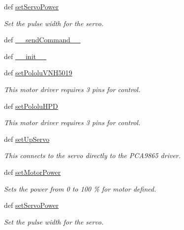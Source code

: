 \begin{DoxyCompactItemize}
def \hyperlink{classinterface_1_1MOTOR__CORE_1_1DC_a9d0cb15bc32abd7e5ffef57a9d83c9b1}{set\+Servo\+Power}
\begin{DoxyCompactList}\small\item\em Set the pulse width for the servo. \end{DoxyCompactList}\item 
def \hyperlink{classinterface_1_1MOTOR__CORE_1_1DC_a143580f4f51c92080dd75f2b70b56d2d}{\+\_\+\+\_\+send\+Command\+\_\+\+\_\+}
\item 
def \hyperlink{classinterface_1_1MOTOR__CORE_1_1DC_a7adcb2ca9d22b0a94b53a09347f9c2b7}{\+\_\+\+\_\+init\+\_\+\+\_\+}
\item 
def \hyperlink{classinterface_1_1MOTOR__CORE_1_1DC_a07432431affa760aec0760871db95d59}{set\+Pololu\+V\+N\+H5019}
\begin{DoxyCompactList}\small\item\em This motor driver requires 3 pins for control. \end{DoxyCompactList}\item 
def \hyperlink{classinterface_1_1MOTOR__CORE_1_1DC_a562d14585f151182842fe34106a1d88c}{set\+Pololu\+H\+P\+D}
\begin{DoxyCompactList}\small\item\em This motor driver requires 3 pins for control. \end{DoxyCompactList}\item 
def \hyperlink{classinterface_1_1MOTOR__CORE_1_1DC_a11b3993f834e3a032134faacc590ad6a}{set\+Up\+Servo}
\begin{DoxyCompactList}\small\item\em This connects to the servo directly to the P\+C\+A9865 driver. \end{DoxyCompactList}\item 
def \hyperlink{classinterface_1_1MOTOR__CORE_1_1DC_acd058e10f316149548b64f26a75f6dc5}{set\+Motor\+Power}
\begin{DoxyCompactList}\small\item\em Sets the power from 0 to 100 \% for motor defined. \end{DoxyCompactList}\item 
def \hyperlink{classinterface_1_1MOTOR__CORE_1_1DC_a9d0cb15bc32abd7e5ffef57a9d83c9b1}{set\+Servo\+Power}
\begin{DoxyCompactList}\small\item\em Set the pulse width for the servo. \end{DoxyCompactList}\item 

\end{DoxyCompactItemize}
